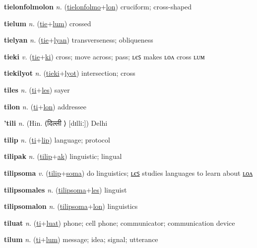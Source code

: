 \textbf{\hypertarget{tielonfolmolon}{tielonfolmolon}} \textit{n.} (\hyperlink{tielonfolmo}{tielonfolmo}+\allowbreak \hyperlink{lon}{lon})
cruciform; cross-shaped

\textbf{\hypertarget{tielum}{tielum}} \textit{n.} (\hyperlink{tie}{tie}+\allowbreak \hyperlink{lum}{lum})
crossed

\textbf{\hypertarget{tielyan}{tielyan}} \textit{n.} (\hyperlink{tie}{tie}+\allowbreak \hyperlink{lyan}{lyan})
transverseness; obliqueness

\textbf{\hypertarget{tieki}{tieki}} \textit{v.} (\hyperlink{tie}{tie}+\allowbreak \hyperlink{ki}{ki})
cross; move across; pass; ʟєꜱ makes ʟᴏᴧ cross ʟᴜᴍ

\textbf{\hypertarget{tiekilyot}{tiekilyot}} \textit{n.} (\hyperlink{tieki}{tieki}+\allowbreak \hyperlink{lyot}{lyot})
intersection; cross

\textbf{\hypertarget{tiles}{tiles}} \textit{n.} (\hyperlink{ti}{ti}+\allowbreak \hyperlink{les}{les})
sayer

\textbf{\hypertarget{tilon}{tilon}} \textit{n.} (\hyperlink{ti}{ti}+\allowbreak \hyperlink{lon}{lon})
addressee

\textbf{\hypertarget{'tili}{'tili}} \textit{n.} (Hin. ⟨{\devanagari{}दिल्ली }⟩ [dɪlliː])
Delhi

\textbf{\hypertarget{tilip}{tilip}} \textit{n.} (\hyperlink{ti}{ti}+\allowbreak \hyperlink{lip}{lip})
language; protocol

\textbf{\hypertarget{tilipak}{tilipak}} \textit{n.} (\hyperlink{tilip}{tilip}+\allowbreak \hyperlink{ak}{ak})
linguistic; lingual

\textbf{\hypertarget{tilipsoma}{tilipsoma}} \textit{v.} (\hyperlink{tilip}{tilip}+\allowbreak \hyperlink{soma}{soma})
do linguistics; \hyperlink{tilipsomales}{ʟєꜱ} studies languages to learn about \hyperlink{tilipsomalon}{ʟᴏᴧ}

\textbf{\hypertarget{tilipsomales}{tilipsomales}} \textit{n.} (\hyperlink{tilipsoma}{tilipsoma}+\allowbreak \hyperlink{les}{les})
linguist

\textbf{\hypertarget{tilipsomalon}{tilipsomalon}} \textit{n.} (\hyperlink{tilipsoma}{tilipsoma}+\allowbreak \hyperlink{lon}{lon})
linguistics

\textbf{\hypertarget{tiluat}{tiluat}} \textit{n.} (\hyperlink{ti}{ti}+\allowbreak \hyperlink{luat}{luat})
phone; cell phone; communicator; communication device

\textbf{\hypertarget{tilum}{tilum}} \textit{n.} (\hyperlink{ti}{ti}+\allowbreak \hyperlink{lum}{lum})
message; idea; signal; utterance


